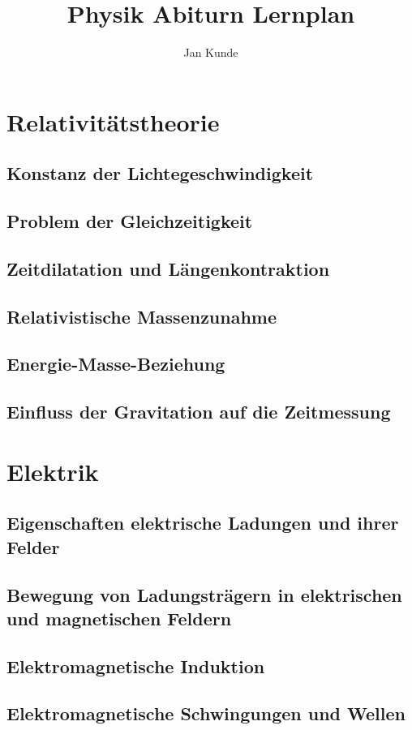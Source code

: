 \documentclass[12pt]{article}
\title{Physik Abiturn Lernplan}
\author{Jan Kunde}
\begin{document}
\maketitle
\section{Relativitätstheorie}
    \subsection{Konstanz der Lichtegeschwindigkeit}
    \subsection{Problem der Gleichzeitigkeit}
    \subsection{Zeitdilatation und Längenkontraktion}
    \subsection{Relativistische Massenzunahme}
    \subsection{Energie-Masse-Beziehung}
    \subsection{Einfluss der Gravitation auf die Zeitmessung}


\section{Elektrik}
    \subsection{Eigenschaften elektrische Ladungen und ihrer Felder}
    \subsection{Bewegung von Ladungsträgern in elektrischen und magnetischen Feldern}
    \subsection{Elektromagnetische Induktion}
    \subsection{Elektromagnetische Schwingungen und Wellen}
\end{document}
